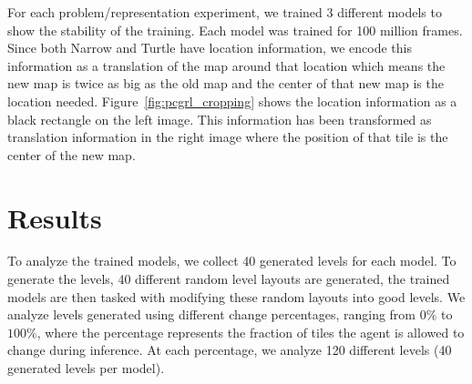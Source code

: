 \documentclass[letterpaper]{article} %
\begin{document}
For each problem/representation experiment, we trained 3 different models to show the stability of the training. Each model was trained for 100 million frames. Since both Narrow and Turtle have location information, we encode this information as a translation of the map around that location which means the new map is twice as big as the old map and the center of that new map is the location needed. Figure~\ref{fig:pcgrl_cropping} shows the location information as a black rectangle on the left image. This information has been transformed as translation information in the right image where the position of that tile is the center of the new map.

\section{Results}

\begin{table}
    \centering
    \caption{Percentage of map changed by the agent during inference when allowed unlimited changes.}
    \label{tab:change_percentages}
\end{table}

To analyze the trained models, we collect 40 generated levels for each model. To generate the levels, 40 different random level layouts are generated, the trained models are then tasked with modifying these random layouts into good levels. We analyze levels generated using different change percentages, ranging from $0\%$ to $100\%$, where the percentage represents the fraction of tiles the agent is allowed to change during inference. At each percentage, we analyze 120 different levels (40 generated levels per model).
\end{document}
